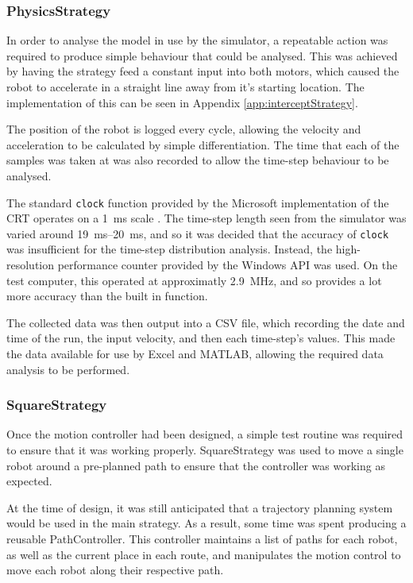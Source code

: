 \documentclass[10pt]{article}
\begin{document}
\subsubsection{PhysicsStrategy}

In order to analyse the model in use by the simulator, a repeatable
action was required to produce simple behaviour that could be analysed.  This
was achieved by having the strategy feed a constant input into both motors,
which caused the robot to accelerate in a straight line away from it's starting
location.  The implementation of this can be seen in Appendix
\ref{app:interceptStrategy}.

The position of the robot is logged every cycle, allowing the velocity and
acceleration to be calculated by simple differentiation.  The time that each of
the samples was taken at was also recorded to allow the time-step behaviour to be
analysed.

The standard \texttt{clock} function provided by the Microsoft implementation of
the CRT operates on a \SI{1}{\milli\second} scale \cite{windowsSDK}.  The
time-step length seen from the simulator was varied around
\SIrange{19}{20}{\milli\second}, and so it was decided that the accuracy of
\texttt{clock} was insufficient for the time-step distribution analysis.
Instead, the high-resolution performance counter provided by the Windows API was
used.  On the test computer, this operated at approximatly
\SI{2.9}{\mega\hertz}, and so provides a lot more accuracy than the built in
function.  

The collected data was then output into a CSV file, which recording the
date and time of the run, the input velocity, and then each time-step's values. 
This made the data available for use by Excel and MATLAB, allowing the required
data analysis to be performed.

\subsubsection{SquareStrategy}

Once the motion controller had been designed, a simple test routine was required
to ensure that it was working properly.  SquareStrategy was used to move a
single robot around a pre-planned path to ensure that the controller was working
as expected.

At the time of design, it was still anticipated that a trajectory planning
system would be used in the main strategy.  As a result, some time was spent
producing a reusable PathController.  This controller maintains a list of paths
for each robot, as well as the current place in each route, and manipulates the
motion control to move each robot along their respective path.
\end{document}
